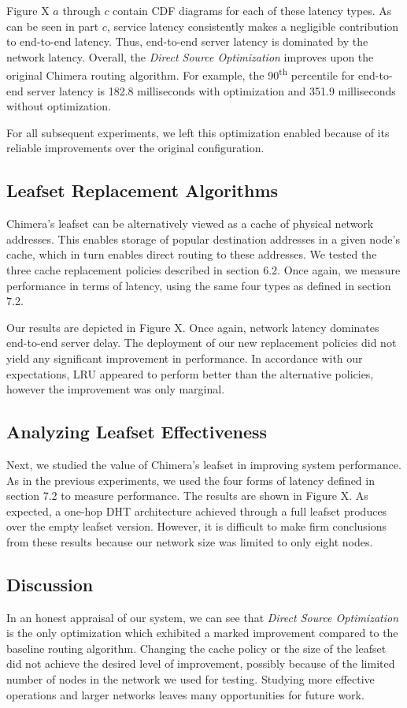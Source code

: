 Figure X $a$ through $c$ contain CDF diagrams for each of these latency types. As can be seen in part $c$, service latency consistently makes a negligible contribution to end-to-end latency. Thus, end-to-end server latency is dominated by the network latency. Overall, the \textit{Direct Source Optimization} improves upon the original Chimera routing algorithm. For example, the 90\textsuperscript{th} percentile for end-to-end server latency is 182.8 milliseconds with optimization and 351.9 milliseconds without optimization.

For all subsequent experiments, we left this optimization enabled because of its reliable improvements over the original configuration.

\subsection{Leafset Replacement Algorithms}
Chimera's leafset can be alternatively viewed as a cache of physical network addresses. This enables storage of popular destination addresses in a given node's cache, which in turn enables direct routing to these addresses. We tested the three cache replacement policies described in section 6.2. Once again, we measure performance in terms of latency, using the same four types as defined in section 7.2.

Our results are depicted in Figure X. Once again, network latency dominates end-to-end server delay. The deployment of our new replacement policies did not yield any significant improvement in performance. In accordance with our expectations, LRU appeared to perform better than the alternative policies, however the improvement was only marginal. 

\subsection{Analyzing Leafset Effectiveness}
Next, we studied the value of Chimera's leafset in improving system performance. As in the previous experiments, we used the four forms of latency defined in section 7.2 to measure performance. The results are shown in Figure X.  As expected, a one-hop DHT architecture achieved through a full leafset produces over the empty leafset version. However, it is difficult to make firm conclusions from these results because our network size was limited to only eight nodes.

\subsection{Discussion}
In an honest appraisal of our system, we can see that \textit{Direct Source Optimization} is the only optimization which exhibited a marked improvement compared to the baseline routing algorithm. Changing the cache policy or the size of the leafset did not achieve the desired level of improvement, possibly because of the limited number of nodes in the network we used for testing. Studying more effective operations and larger networks leaves many opportunities for future work.